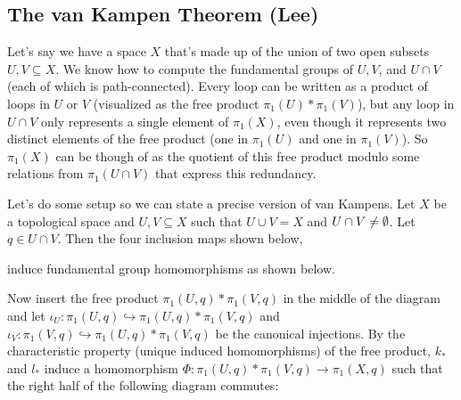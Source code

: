 \subsection{The van Kampen Theorem (Lee)}
Let's say we have a space $X$ that's made up of the union of two open subsets $U,V\subseteq X$. We know how to compute the fundamental groups of $U,V$, and $U\cap V$ (each of which is path-connected). Every loop can be written as a product of loops in $U$ or $V$ (visualized as the free product $\pi_1(U)*\pi_1(V)$), but any loop in $U\cap V$ only represents a single element of $\pi_1(X)$, even though it represents two distinct elements of the free product (one in $\pi_1(U)$ and one in $\pi_1(V)$). So $\pi_1(X)$ can be though of as the quotient of this free product modulo some relations from $\pi_1(U\cap V)$ that express this redundancy.

Let's do some setup so we can state a precise version of van Kampens. Let $X$ be a topological space and $U,V\subseteq X$ such that $U \cup V=X$ and $U\cap V\neq \emptyset$. Let $q\in U\cap V$. Then the four inclusion maps shown below,
            \begin{figure}[H]
                \centering
            \end{figure}
            induce fundamental group homomorphisms as shown below.
                        \begin{figure}[H]
                \centering
            \end{figure}
            Now insert the free product $\pi_1(U,q)*\pi_1(V,q)$ in the middle of the diagram and let $\iota_U \colon \pi_1(U,q) \hookrightarrow \pi_1(U,q)*\pi_1(V,q)$ and $\iota_V \colon \pi_1(V,q) \hookrightarrow \pi_1(U,q)*\pi_1(V,q)$ be the canonical injections. By the characteristic property (unique induced homomorphisms) of the free product, $k_*$ and $l_*$ induce a homomorphism $\Phi \colon \pi_1(U,q)*\pi_1(V,q) \to \pi_1(X,q)$ such that the right half of the following diagram commutes:


